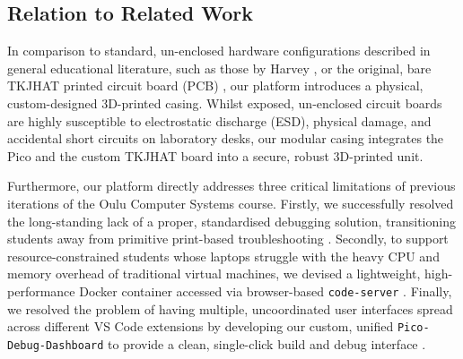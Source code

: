 \subsection{Relation to Related Work}

In comparison to standard, un-enclosed hardware configurations described in general educational literature, such as those by Harvey \cite{harvey_pico}, or the original, bare TKJHAT printed circuit board (PCB) \cite{kelhala:2024}, our platform introduces a physical, custom-designed 3D-printed casing. Whilst exposed, un-enclosed circuit boards are highly susceptible to electrostatic discharge (ESD), physical damage, and accidental short circuits on laboratory desks, our modular casing integrates the Pico and the custom TKJHAT board into a secure, robust 3D-printed unit.

Furthermore, our platform directly addresses three critical limitations of previous iterations of the Oulu Computer Systems course. Firstly, we successfully resolved the long-standing lack of a proper, standardised debugging solution, transitioning students away from primitive print-based troubleshooting \cite{tkj_vm_history}. Secondly, to support resource-constrained students whose laptops struggle with the heavy CPU and memory overhead of traditional virtual machines, we devised a lightweight, high-performance Docker container accessed via browser-based \texttt{code-server} \cite{code_server}. Finally, we resolved the problem of having multiple, uncoordinated user interfaces spread across different VS Code extensions by developing our custom, unified \texttt{Pico-Debug-Dashboard} to provide a clean, single-click build and debug interface \cite{pico_debug_dashboard}.

